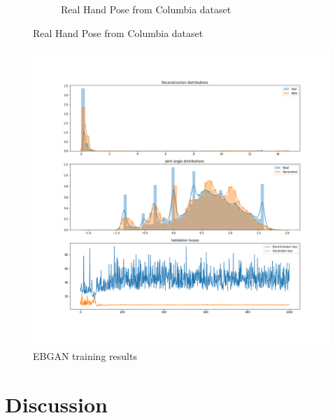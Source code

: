 \documentclass[10pt,twocolumn,letterpaper]{article}
\begin{document}
\begin{figure}[t]
\begin{subfigure}[t]{0.23\textwidth}
\caption{Real Hand Pose from Columbia dataset}
\end{subfigure}
\end{figure}

\begin{figure}[h]
\centering
\includegraphics[scale=0.45]{gan_res.png}
\caption{EBGAN training results}
\label{fig:ganresults}
\end{figure}
\section{Discussion}


{\small


}
\end{document}
